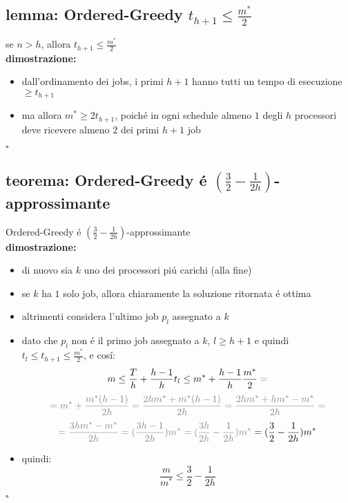 
\subsection*{lemma: Ordered-Greedy $t_{h+1}\leq\frac{m^*}{2}$}
\begin{flushleft}
	se $n>h$, allora $t_{h+1}\leq\frac{m^*}{2}$ \newline \\
	\vspace{0.5cm}
	\textbf{dimostrazione:}
	\begin{itemize}
		\item dall'ordinamento dei jobs, i primi $h+1$ hanno tutti un tempo di esecuzione $\geq t_{h+1}$
		\item ma allora $m^*\geq 2 t_{h+1}$, poich\'e in ogni schedule almeno $1$ degli $h$ processori deve ricevere almeno $2$ dei primi $h+1$ job
	\end{itemize}
	\hfill$\square$
\end{flushleft}


\subsection*{teorema: Ordered-Greedy \'e $(\frac{3}{2}-\frac{1}{2h})$-approssimante}
\begin{flushleft}
	Ordered-Greedy \'e $(\frac{3}{2}-\frac{1}{2h})$-approssimante \newline \\
	\vspace{0.5cm}
	\textbf{dimostrazione:}
	\begin{itemize}
		\item di nuovo sia $k$ uno dei processori pi\'u carichi (alla fine)
		\item se $k$ ha $1$ solo job, allora chiaramente la soluzione ritornata \'e ottima
		\item altrimenti considera l'ultimo job $p_l$ assegnato a $k$
		\item dato che $p_l$ non \'e il primo job assegnato a $k$, $l\geq h+1$ e quindi $t_l\leq t_{h+1}\leq\frac{m^*}{2}$, e cos\'i:
			$$m\leq\frac{T}{h}+\frac{h-1}{h}t_l\leq m^*+\frac{h-1}{h}\frac{m^*}{2}\color{gray}=$$
			$$\color{gray}=m^*+\frac{m^*(h-1)}{2h}=\frac{2hm^*+m^*(h-1)}{2h}=\frac{2hm^*+hm^*-m^*}{2h}=$$
			$$\color{gray}=\frac{3hm^*-m^*}{2h}=(\frac{3h-1}{2h})m^*=(\frac{3h}{2h}-\frac{1}{2h})m^*\color{black}=(\frac{3}{2}-\frac{1}{2h})m^*$$
		\item quindi:
			$$\frac{m}{m^*}\leq\frac{3}{2}-\frac{1}{2h}$$
	\end{itemize}
	\hfill$\square$
\end{flushleft}

